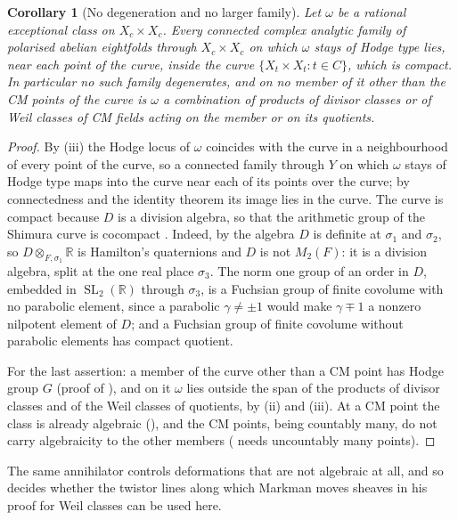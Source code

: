 \documentclass[11pt,reqno]{amsart}
\theoremstyle{plain}
\newtheorem{corollary}[theorem]{Corollary}
\theoremstyle{definition}
\theoremstyle{remark}
\newcommand{\RR}{\mathbb{R}}
\DeclareMathOperator{\SL}{SL}
\begin{document}
\begin{corollary}[No degeneration and no larger family]
\label{cor:nodegeneration}
Let $\omega$ be a rational exceptional class on $X_{c}\times X_{c}$. Every
connected complex analytic family of polarised abelian eightfolds through
$X_{c}\times X_{c}$ on which $\omega$ stays of Hodge type lies, near each
point of the curve, inside the curve $\{X_{t}\times X_{t}:t\in C\}$, which is
compact. In particular no such family degenerates, and on no member of it
other than the CM points of the curve is $\omega$ a combination of products
of divisor classes or of Weil classes of CM fields acting on the member or on
its quotients.
\end{corollary}

\begin{proof}
By (iii) the Hodge locus of $\omega$ coincides with the
curve in a neighbourhood of every point of the curve, so a connected family
through $Y$ on which $\omega$ stays of Hodge type maps into the curve near
each of its points over the curve; by connectedness and the identity theorem
its image lies in the curve. The curve is compact because $D$ is a division
algebra, so that the arithmetic group of the Shimura curve is cocompact
\cite{Mum69}. Indeed, by  the algebra $D$ is definite at
$\sigma_{1}$ and $\sigma_{2}$, so $D\otimes_{F,\sigma_{1}}\RR$ is Hamilton's
quaternions and $D$ is not $M_{2}(F)$: it is a division algebra, split at the
one real place $\sigma_{3}$. The norm one group of an order in $D$, embedded
in $\SL_{2}(\RR)$ through $\sigma_{3}$, is a Fuchsian group of finite
covolume with no parabolic element, since a parabolic $\gamma\ne\pm1$ would
make $\gamma\mp1$ a nonzero nilpotent element of $D$; and a Fuchsian group of
finite covolume without parabolic elements has compact quotient.

For the last assertion: a member of the curve other than a CM point has
Hodge group $G$ (proof of ), and on it $\omega$ lies
outside the span of the products of divisor classes and of the Weil classes
of quotients, by (ii) and (iii). At a CM point the
class is already algebraic (), and the CM points, being
countably many, do not carry algebraicity to the other members
( needs uncountably many points).
\end{proof}

The same annihilator controls deformations that are not algebraic at all,
and so decides whether the twistor lines along which Markman moves sheaves
in his proof for Weil classes can be used here.
\end{document}
